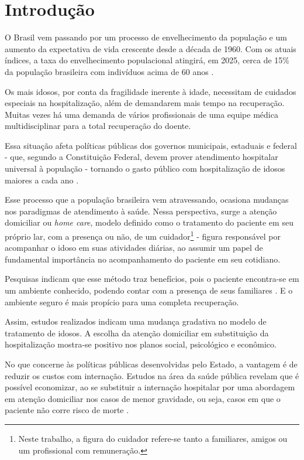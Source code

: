 \chapter{Introdução}\label{cap:introducao}

O Brasil vem passando por um processo de envelhecimento da população e
um aumento da expectativa de vida crescente desde a década de 1960. 
Com os atuais índices, a taxa do envelhecimento populacional atingirá, 
em 2025, cerca de 15\% da população brasileira com indivíduos acima 
de 60 anos \cite{gonccalves2006perfil}. 

Os mais idosos, por conta da fragilidade inerente à idade, necessitam de 
cuidados especiais na hospitalização, além de demandarem mais tempo na 
recuperação. Muitas vezes há uma demanda de vários profissionais de uma equipe 
médica multidisciplinar para a total recuperação do doente.

Essa situação afeta políticas públicas dos governos municipais, estaduais e
federal - que, segundo a Constituição Federal, devem prover atendimento
hospitalar universal à população - tornando o gasto público com hospitalização
de idosos maiores a cada ano \cite{da2013gastos}.

Esse processo que a população brasileira vem atravessando, ocasiona
mudanças  nos paradigmas de atendimento à saúde. Nessa perspectiva, surge a
atenção domiciliar ou \textit{home care}, modelo definido como o tratamento do
paciente em seu próprio lar, com a presença ou não, de um
cuidador\footnote{Neste trabalho, a figura do cuidador refere-se tanto a
familiares, amigos ou um profissional com remuneração.} - figura responsável por
acompanhar o idoso em suas atividades diárias, ao assumir um papel de
fundamental importância no acompanhamento do paciente em seu cotidiano.

Pesquisas indicam que esse método traz benefícios, pois o  paciente encontra-se
em um ambiente conhecido, podendo contar com a presença de seus familiares
\cite{hermann2007atendimento, day2010beneficios}. E o ambiente seguro é mais
propício para uma completa recuperação.

Assim, estudos realizados indicam uma mudança gradativa no modelo de tratamento
de idosos. A escolha da atenção domiciliar em substituição da hospitalização 
mostra-se positivo nos planos social, psicológico e econômico. 

No que concerne às políticas públicas desenvolvidas pelo Estado,  a vantagem é
de reduzir os custos com internação. Estudos na área da saúde pública revelam  que é possível economizar,
ao se substituir a internação hospitalar por uma  abordagem em atenção 
domiciliar nos casos de menor gravidade,  ou seja, casos em que o paciente não 
corre risco de morte \cite{bourdette1993health}.  


